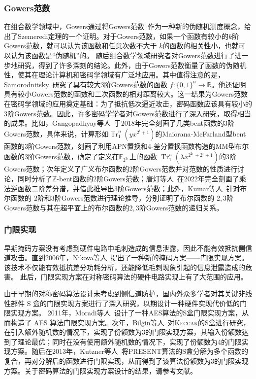 \documentclass[a4paper,zihao=-4,AutoFakeBold]{ctexart}
\newcommand{\Tr}{\operatorname{Tr}_1^n}
\newcommand{\F}{\mathbb{F}}
\newcommand{\Z}{\mathbb{Z}}
\begin{document}
\subsubsection{Gowers范数}
在组合数学领域中，Gowers通过将Gowers范数~\cite{Gowers1998A}作为一种新的伪随机测度概念，给出了Szemeredi定理的一个证明。对于Gowers范数，如果一个函数有较小的$k$阶Gowers范数，就可以认为该函数和任意次数不大于 $k$的函数的相关性小，也就可以认为该函数是``伪随机''的。
随后组合数学领域研究者对Gowers范数进行了进一步地研究，得到了许多深刻的结论。此外，由于Gowers范数衡量了函数的伪随机性，使其在理论计算机和密码学领域有广泛地应用。其中值得注意的是，Samorodnitsky~\cite{SamSTOCy07}研究了具有较大$3$阶Gowers范数的函数 $f:\{0,1\}^n\to\mathbb{R}$。他还证明具有较小Gowers范数的函数和二次函数的相对距离较大。这一结果为Gowers范数在密码学领域的应用奠定基础：为了抵抗低次逼近攻击，密码函数应该具有较小的$3$阶Gowers范数。因此，许多密码学学者对Gowers范数进行了深入研究，取得相当的成果。比如，Gangopadhyay等人~\cite{GMS18}于2018年完全刻画了几类bent函数的$3$阶Gowers范数，具体来说，计算形如$\Tr(yx^{2^i+1})$的Maiorana-McFarland型bent函数的$3$阶Gowers范数，刻画了利用APN置换和4-差分置换函数构造的MM型布尔函数的$3$阶Gowers范数，确定了定义在$\F_{2^{3r}}$上的函数 $\Tr(\lambda x^{2^{2r}+2^r+1})$的$3$阶Gowers范数；次年定义了广义布尔函数的$2$阶Gowers范数并对范数的性质进行讨论，同时分析了$\Z$-bent函数的$2$阶Gowers范数；唐灯等人~\cite{InverseFuncDAM2021}在2022年完全刻画了乘法逆函数二阶差分谱，并借此推导出$3$阶Gowers范数；此外，Kumar等人~\cite{KumarMG23u2u3}针对布尔函数的 $2$阶和$3$阶Gowers范数进行理论推导，分别证明了布尔函数的 $2,3$阶Gowers范数与其在超平面上的布尔函数的$2,3$阶Gowers范数的递归关系。

\subsubsection{门限实现}
早期掩码方案没有考虑到硬件电路中毛刺造成的信息泄露，因此不能有效抵抗侧信道攻击。直到2006年，Nikova等人~\cite{Nikova06TI}提出了一种新的掩码方案——门限实现方案。该技术不仅能有效抵抗差分功耗分析，还能降低毛刺现象引起的信息泄露造成的危害。
此后，门限实现方案在对称密码算法的硬件电路实现上有了大范围的应用。

由于早期的对称密码算法设计未考虑到侧信道防护，国内外众多学者对其关键非线性部件 S 盒的门限实现方案进行了深入研究，以期设计一种硬件实现代价低的门限实现方案。
2011年，Moradi等人~\cite{moradiPushingLimitsVery2011}设计了一种AES算法的S盒门限实现方案，从而构造了 AES 算法门限实现方案。次年，Bilgin等人~\cite{BilginCARDIS13}对\textsc{Keccak}的S盒进行研究，在引入额外随机数的情况下，实现了份额数为3的门限实现方案，其输入份额数达到了理论最优；同时在没有使用额外随机数的情况下，实现了份额数为4的门限实现方案。随后在2013年，Kutzner等人~\cite{kutzner13decomposeSbox_TI}将PRESENT算法的S盒分解为多个函数的复合，再对分解后的函数进行门限实现，从而得到了该算法份额数为$3$的门限实现方案。关于密码算法的门限实现方案设计的结果，请参考文献。
\end{document}
